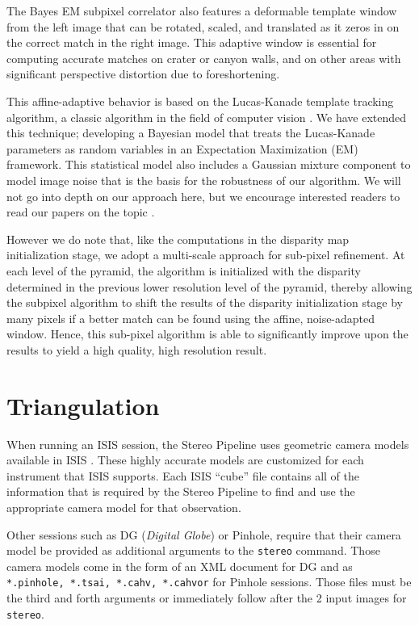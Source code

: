 The Bayes EM subpixel correlator also features a deformable template
window from the left image that can be rotated, scaled, and translated
as it zeros in on the correct match in the right image.  This
adaptive window is essential for computing accurate matches on crater
or canyon walls, and on other areas with significant perspective
distortion due to foreshortening.

This affine-adaptive behavior is based on the Lucas-Kanade template
tracking algorithm, a classic algorithm in the field of computer
vision \citep{Baker04:lucas-kanade}.  We have extended this technique;
developing a Bayesian model that treats the Lucas-Kanade parameters
as random variables in an Expectation Maximization (EM) framework.
This statistical model also includes a Gaussian mixture component
to model image noise that is the basis for the robustness of our
algorithm.  We will not go into depth on our approach here, but we
encourage interested readers to read our papers on the topic
\citep{nefian:bayes_em, broxton:isvc09}.

However we do note that, like the computations in the disparity map
initialization stage, we adopt a multi-scale approach for sub-pixel
refinement. At each level of the pyramid, the algorithm is initialized
with the disparity determined in the previous lower resolution level
of the pyramid, thereby allowing the subpixel algorithm to shift the
results of the disparity initialization stage by many pixels if a better
match can be found using the affine, noise-adapted window.  Hence,
this sub-pixel algorithm is able to significantly improve upon the
results to yield a high quality, high resolution result.

\section{Triangulation}

When running an ISIS session, the Stereo Pipeline uses geometric
camera models available in \ac{ISIS} \citep{anderson08:isis}.  These
highly accurate models are customized for each instrument that
\ac{ISIS} supports.  Each \ac{ISIS} ``cube'' file contains all of the
information that is required by the Stereo Pipeline to find and use
the appropriate camera model for that observation.

Other sessions such as DG (\textit{Digital Globe}) or Pinhole, require that
their camera model be provided as additional arguments to the
\texttt{stereo} command. Those camera models come in the form of an
XML document for DG and as \texttt{*.pinhole, *.tsai, *.cahv,
  *.cahvor} for Pinhole sessions. Those files must be the third and
forth arguments or immediately follow after the 2 input images for
\texttt{stereo}.

